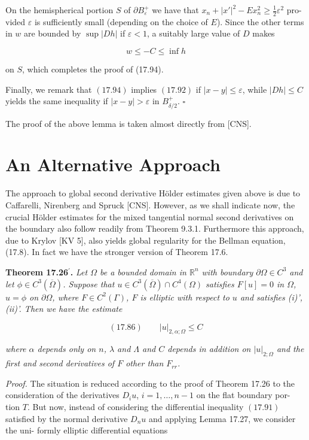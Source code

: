 On the hemispherical portion $S$ of $\partial B_\varepsilon^+$ we have that $x_n + |x'|^2 - E x_n^2 \geq \frac{1}{2}\varepsilon^2$ pro-
vided $\varepsilon$ is sufficiently small (depending on the choice of $E$). Since the other terms in
$w$ are bounded by $\sup |Dh|$ if $\varepsilon < 1$, a suitably large value of $D$ makes

\[
w \leq -C \leq \inf h
\]

on $S$, which completes the proof of (17.94).


Finally, we remark that \((17.94)\) implies \((17.92)\) if \(|x-y| \le \varepsilon\), while \(|Dh| \le C\)
yields the same inequality if \(|x-y| > \varepsilon\) in \(B_{\delta/2}^+\). \(\square\)

The proof of the above lemma is taken almost directly from [CNS].

\section*{An Alternative Approach}

The approach to global second derivative Hölder estimates given above is due to
Caffarelli, Nirenberg and Spruck [CNS]. However, as we shall indicate now, the
crucial Hölder estimates for the mixed tangential normal second derivatives on
the boundary also follow readily from Theorem 9.3.1. Furthermore this approach,
due to Krylov [KV 5], also yields global regularity for the Bellman equation,
(17.8). In fact we have the stronger version of Theorem 17.6.

\textbf{Theorem 17.26\(^\prime\).} \textit{Let \(\Omega\) be a bounded domain in \(\mathbb{R}^n\) with boundary \(\partial\Omega \in C^3\) and let
\(\phi \in C^3(\overline{\Omega})\). Suppose that \(u \in C^3(\overline{\Omega}) \cap C^4(\Omega)\) satisfies \(F[u] = 0\) in \(\Omega\), \(u = \phi\) on \(\partial\Omega\),
where \(F \in C^2(\Gamma)\), \(F\) is elliptic with respect to \(u\) and satisfies (i)', (ii)'. Then we have
the estimate}

\[
(17.86)\qquad |u|_{2,\alpha;\Omega} \le C
\]

\textit{where \(\alpha\) depends only on \(n\), \(\lambda\) and \(\Lambda\) and \(C\) depends in addition on \(|u|_{2;\Omega}\) and the first
and second derivatives of \(F\) other than \(F_{rr}\).}

\textit{Proof.} The situation is reduced according to the proof of Theorem 17.26 to the
consideration of the derivatives \(D_i u\), \(i = 1,\ldots,n-1\) on the flat boundary por-
tion \(T\). But now, instead of considering the differential inequality \((17.91)\) satisfied
by the normal derivative \(D_n u\) and applying Lemma 17.27, we consider the uni-
formly elliptic differential equations

